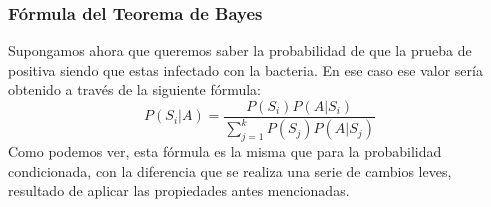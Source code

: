 \documentclass[]{article}
\begin{document}
\subsubsection*{Fórmula del Teorema de Bayes}
Supongamos ahora que queremos saber la probabilidad de que la prueba de positiva siendo que estas infectado con la bacteria. En ese caso ese valor sería obtenido a través de la siguiente fórmula:
\[ P(S_i|A)= \frac{P(S_i)P(A|S_i)}{\sum_{j=1}^k P(S_j)P(A|S_j)} \]
Como podemos ver, esta fórmula es la misma que para la probabilidad condicionada, con la diferencia que se realiza una serie de cambios leves, resultado de aplicar las propiedades antes mencionadas.
\end{document}
